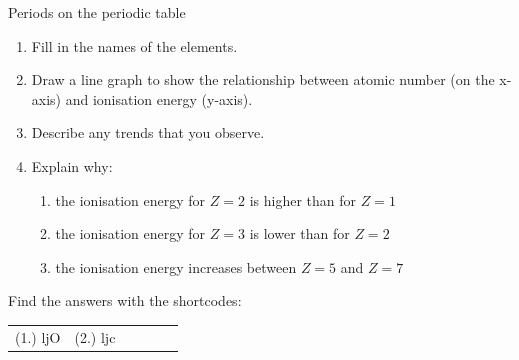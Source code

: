 \begin{exercises}{Periods on the periodic table}
\begin{enumerate}[noitemsep, label=\textbf{\arabic*}. ]
\begin{enumerate}[noitemsep, label=\textbf{\alph*}. ]
 \item Fill in the names of the elements.
\item Draw a line graph to show the relationship between atomic number (on the x-axis) and ionisation energy (y-axis).
\item Describe any trends that you observe.
\item Explain why:
	\begin{enumerate}[noitemsep, label=\textbf{\roman*}. ]
	\item the ionisation energy for $Z=2$ is higher than for $Z=1$
	\item the ionisation energy for $Z=3$ is lower than for $Z=2$
	\item the ionisation energy increases between $Z=5$ and $Z=7$
	\end{enumerate}

\end{enumerate}
\end{enumerate}
      \label{m38757*secfhsst!!!underscore!!!id936}
\practiceinfo
\par {} Find the answers with the shortcodes:
 \par \begin{tabular}[h]{cccccc}
 (1.) ljO  & (2.) ljc \end{tabular}
\end{exercises}

